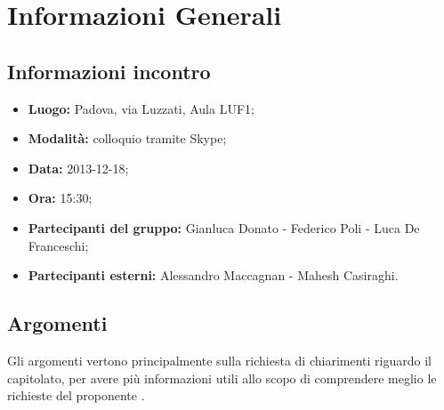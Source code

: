 \section{Informazioni Generali}
	\subsection{Informazioni incontro}
	\begin{itemize}
		\item {\bfseries Luogo:} Padova, via Luzzati, Aula LUF1;
		\item {\bfseries Modalità:} colloquio tramite Skype;
		\item {\bfseries Data:} 2013-12-18;
		\item {\bfseries Ora:} 15:30;
		\item {\bfseries Partecipanti del gruppo:} Gianluca Donato - Federico Poli - Luca De Franceschi;
		\item {\bfseries Partecipanti esterni:} Alessandro Maccagnan - Mahesh Casiraghi.
	\end{itemize}
	
	\subsection{Argomenti}
		Gli argomenti vertono principalmente sulla richiesta di chiarimenti riguardo il capitolato, per avere più informazioni utili allo scopo di comprendere meglio le richieste del proponente \Proponente{}.